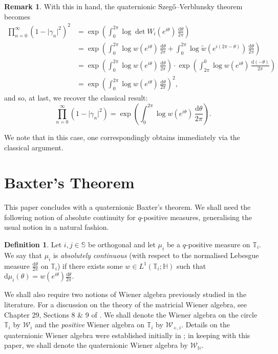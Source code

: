 \documentclass[11pt,reqno]{amsart}
\def\g{\gamma}
\def\th{\theta}
\def\rmd{\mathrm{d}}
\def\SS{\mathbb{S}}
\def\TT{\mathbb{T}}
\def\HH{\mathbb{H}}
\theoremstyle{definition}
\newtheorem{definition}[theorem]{Definition}
\newtheorem{remark}[theorem]{Remark}
\numberwithin{equation}{section}
\renewcommand{\tilde}{\widetilde}
\begin{document}
\begin{remark}
	With this in hand, the quaternionic Szeg\H{o}--Verblunsky theorem becomes
	\begin{align*}
		\prod_{n=0}^{\infty} (1 - \lvert \g_n \rvert^2)^2 & = \exp\left(\int_0^{2\pi} \log \det W_i(e^{i\th}) \, \frac{\rmd\th}{2\pi}\right) \\
		& = \exp\left(\int_0^{2\pi} \log w(e^{i\th}) \, \frac{\rmd\th}{2\pi} + \int_0^{2\pi} \log \tilde{w}(e^{i(2\pi - \th)}) \, \frac{\rmd\th}{2\pi}\right) \\
		& =  \exp\left(\int_0^{2\pi} \log w(e^{i\th}) \, \frac{\rmd\th}{2\pi} \right) \cdot  \exp\left(\int_{2\pi}^{0} \log w(e^{i\th}) \, \frac{\rmd(-\th)}{2\pi} \right) \\
		& = \exp\left(\int_0^{2\pi} \log w(e^{i\th}) \, \frac{\rmd\th}{2\pi} \right)^2,
	\end{align*}
	and so, at last, we recover the classical result:
	\[
		\prod_{n=0}^{\infty} (1 - \lvert \g_n \rvert^2) = \exp\left(\int_0^{2\pi} \log w(e^{i\th}) \, \frac{\rmd\th}{2\pi} \right).
	\]

    We note that in this case, one correspondingly obtains  immediately via the classical argument.
\end{remark}

\section{Baxter's Theorem}
\label{sec:Baxter}

This paper concludes with a quaternionic Baxter's theorem. We shall need the following notion of absolute continuity for \(q\)-positive measures, generalising the usual notion in a natural fashion.

\begin{definition}
    Let \(i,j \in \SS\) be orthogonal and let \(\mu_i\) be a \(q\)-positive measure on \(\TT_i\). We say that \(\mu_i\) is \emph{absolutely continuous} (with respect to the normalised Lebesgue measure \(\frac{\rmd\th}{2\pi}\) on \(\TT_i\)) if there exists some \(w \in L^1(\TT_i; \HH)\) such that \(\rmd\mu_i(\th) = w(e^{i\th}) \frac{\rmd\th}{2\pi}\).
\end{definition}

We shall also require two notions of Wiener algebra previously studied in the literature. For a discussion on the theory of the matricial Wiener algebra, see Chapter 29, Sections 8 \& 9 of \cite{GGK93}. We shall denote the Wiener algebra on the circle \(\TT_i\) by \(\mathscr{W}_i\) and the \emph{positive} Wiener algebra on \(\TT_i\) by \(\mathscr{W}_{+,i}\). Details on the quaternionic Wiener algebra were established initially in \cite{ACKS16}; in keeping with this paper, we shall denote the quaternionic Wiener algebra by \(\mathscr{W}_{\HH}\).
\end{document}
